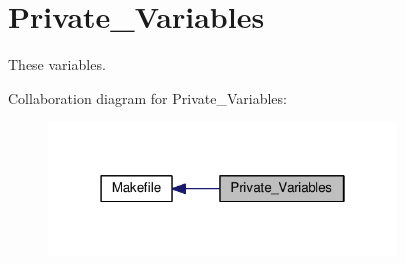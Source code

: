 \hypertarget{group___private___variables}{\section{Private\+\_\+\+Variables}
\label{group___private___variables}
}


These variables.  


Collaboration diagram for Private\+\_\+\+Variables\+:
\nopagebreak
\begin{figure}[H]
\begin{center}
\leavevmode
\includegraphics[width=262pt]{group___private___variables}
\end{center}
\end{figure}
